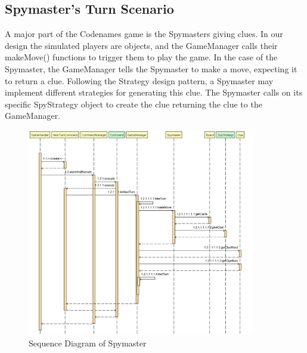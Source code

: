 \subsection{Spymaster's Turn Scenario}
A major part of the Codenames game is the Spymasters giving clues. In our design the simulated players are objects, and the GameManager calls their makeMove() functions to trigger them to play the game. In the case of the Spymaster, the GameManager tells the Spymaster to make a move, expecting it to return a clue. Following the Strategy design pattern, a Spymaster may implement different strategies for generating this clue. The Spymaster calls on its specific SpyStrategy object to create the clue returning the clue to the GameManager.


\begin{figure}[H]
\centering
\includegraphics[width=10cm]{Source/DynamicDesign/Scenario/Spymaster.png}
\caption{Sequence Diagram of Spymaster}
\end{figure}